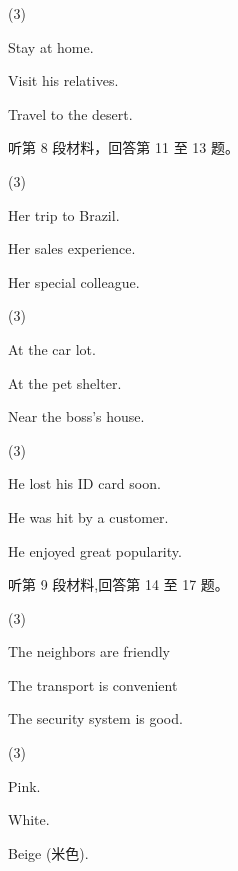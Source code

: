 \documentclass{英语试卷}
\begin{document}
\begin{choices}(3)
  \item Stay at home.
  \item Visit his relatives.
  \item Travel to the desert.
\end{choices}
\par 听第 8 段材料，回答第 11 至 13 题。\par
{}
\begin{choices}(3)
  \item Her trip to Brazil.
  \item Her sales experience.
  \item Her special colleague.
\end{choices}
\begin{choices}(3)
  \item At the car lot.
  \item At the pet shelter.
  \item Near the boss's house.
\end{choices}
\begin{choices}(3)
  \item He lost his ID card soon.
  \item He was hit by a customer.
  \item He enjoyed great popularity.
\end{choices}
\par 听第 9 段材料,回答第 14 至 17 题。\par
{}
\begin{choices}(3)
  \item The neighbors are friendly
  \item The transport is convenient
  \item The security system is good.
\end{choices}
\begin{choices}(3)
  \item Pink.
  \item White.
  \item Beige (米色).
\end{choices}
\end{document}
